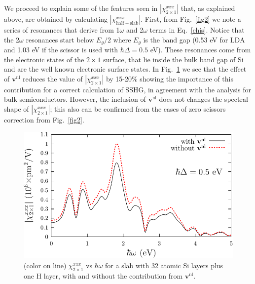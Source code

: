 \documentclass[floatfix,prb,aps,superscriptaddress,showpacs,11pt,preprint,letterpaper]{revtex4}
\begin{document}
We proceed to explain 
some of the features seen in $|\chi^{xxx}_{2\times 1}|$ that, as
explained above, are obtained 
by calculating $|\chi^{xxx}_{\mathrm{half-slab}}|$.
First, from Fig.~\ref{fig2} we note a series of resonances 
that derive from 1$\omega$ and 2$\omega$ terms in
Eq.~\eqref{chis}. 
Notice that the 
2$\omega$ resonances start below $E_g/2$ where $E_g$ is the band gap
(0.53 eV  for LDA and
1.03 eV if the scissor is used with
$\hbar\Delta=0.5$ eV).
These resonances
come from the electronic states of the 
$2\times 1$ surface, that lie inside the bulk band gap of Si and are the 
well known electronic surface states.\cite{rohlfingPRB95} 
In Fig.~\ref{fig3}
we see that the effect of $\mathbf{v}^\mathrm{nl}$
 reduces the value of   
$|\chi^{xxx}_{2\times 1}|$  
by 15-20\% 
showing the importance of this contribution for a correct calculation  
of SSHG, in agreement with the analysis for bulk semiconductors.\cite{luppiPRB08}
However, the inclusion of $\mathbf{v}^\mathrm{nl}$ does not
changes the 
spectral shape of $|\chi^{xxx}_{2\times 1}|$;
 this also can be confirmed from
the cases of zero scissors correction from Fig.~\ref{fig2}.
\begin{figure}
\centering 
\includegraphics[scale=.8]{plots/fig3}
\caption{(color on line) 
$\chi^{xxx}_{2\times 1}$
vs $\hbar\omega$ for a slab with 32 
atomic Si layers plus one H layer, 
with and without the contribution from $\mathbf{v}^\mathrm{nl}$.
\label{fig3}} 
\end{figure}
\end{document}
